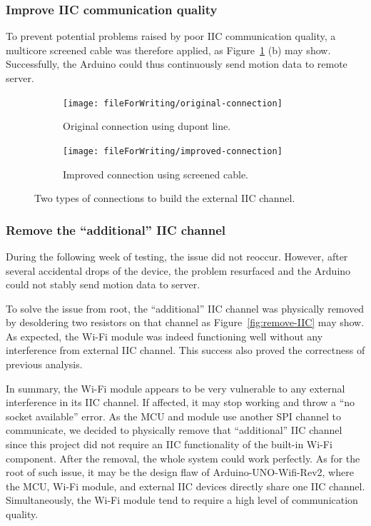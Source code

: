 \subsubsection{Improve IIC communication quality}

To prevent potential problems raised by poor IIC communication quality, a multicore screened cable was therefore applied, as Figure~\ref{fig:IIC-connections} (b) may show.
Successfully, the Arduino could thus continuously send motion data to remote server.


\begin{figure}[htbp]
	\centering
	\begin{subfigure}[b]{0.45\textwidth}
		\centering
		\texttt{[image: fileForWriting/original-connection]}
		\caption{Original connection using dupont line.}
	\end{subfigure}
	\hfill
	\begin{subfigure}[b]{0.45\textwidth}
		\centering
		\texttt{[image: fileForWriting/improved-connection]}
		\caption{Improved connection using screened cable.}
	\end{subfigure}
	\caption[]{Two types of connections to build the external IIC channel.}
	\label{fig:IIC-connections}
\end{figure}

\subsubsection{Remove the ``additional'' IIC channel}
During the following week of testing, the issue did not reoccur.
However, after several accidental drops of the device, the problem resurfaced and the Arduino could not stably send motion data to server.

To solve the issue from root, the ``additional'' IIC channel was physically removed by desoldering two resistors on that channel as Figure~\ref{fig:remove-IIC} may show.
As expected, the Wi-Fi module was indeed functioning well without any interference from external IIC channel.
This success also proved the correctness of previous analysis.


In summary, the Wi-Fi module appears to be very vulnerable to any external interference in its IIC channel.
If affected, it may stop working and throw a ``no socket available'' error.
As the MCU and module use another SPI channel to communicate, we decided to physically remove that ``additional'' IIC channel since this project did not require an IIC functionality of the built-in Wi-Fi component.
After the removal, the whole system could work perfectly.
As for the root of such issue, it may be the design flaw of Arduino-UNO-Wifi-Rev2, where the MCU, Wi-Fi module, and external IIC devices directly share one IIC channel.
Simultaneously, the Wi-Fi module tend to require a high level of communication quality.


